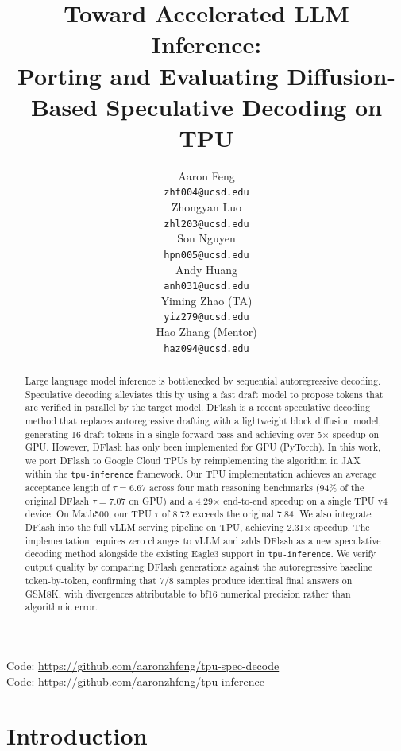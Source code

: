 \documentclass[12pt,letterpaper]{article}
\title{Toward Accelerated LLM Inference:\\Porting and Evaluating Diffusion-Based Speculative Decoding on TPU}
\author{Aaron Feng \\
  {\tt zhf004@ucsd.edu} \\\And
  Zhongyan Luo \\
  {\tt zhl203@ucsd.edu} \\\And
  Son Nguyen \\
  {\tt hpn005@ucsd.edu} \\\And
  Andy Huang \\
  {\tt anh031@ucsd.edu} \\\AND
  Yiming Zhao (TA) \\
  {\tt yiz279@ucsd.edu} \\\And
  Hao Zhang (Mentor) \\
  {\tt haz094@ucsd.edu} \\}
\begin{document}
\maketitle


\begin{abstract}
Large language model inference is bottlenecked by sequential autoregressive decoding. Speculative decoding alleviates this by using a fast draft model to propose tokens that are verified in parallel by the target model. DFlash is a recent speculative decoding method that replaces autoregressive drafting with a lightweight block diffusion model, generating 16 draft tokens in a single forward pass and achieving over 5$\times$ speedup on GPU. However, DFlash has only been implemented for GPU (PyTorch). In this work, we port DFlash to Google Cloud TPUs by reimplementing the algorithm in JAX within the \texttt{tpu-inference} framework. Our TPU implementation achieves an average acceptance length of $\tau=6.67$ across four math reasoning benchmarks (94\% of the original DFlash $\tau=7.07$ on GPU) and a 4.29$\times$ end-to-end speedup on a single TPU v4 device. On Math500, our TPU $\tau$ of 8.72 exceeds the original 7.84. We also integrate DFlash into the full vLLM serving pipeline on TPU, achieving 2.31$\times$ speedup. The implementation requires zero changes to vLLM and adds DFlash as a new speculative decoding method alongside the existing Eagle3 support in \texttt{tpu-inference}. We verify output quality by comparing DFlash generations against the autoregressive baseline token-by-token, confirming that 7/8 samples produce identical final answers on GSM8K, with divergences attributable to bf16 numerical precision rather than algorithmic error.
\end{abstract}

\begin{center}
Code: \url{https://github.com/aaronzhfeng/tpu-spec-decode} \\
Code: \url{https://github.com/aaronzhfeng/tpu-inference}
\end{center}

\maketoc
\clearpage


\section{Introduction}
\end{document}
